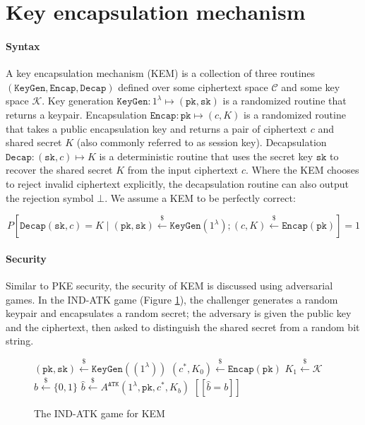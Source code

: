 \documentclass[letterpaper,12pt,titlepage,oneside,final]{book}
\newcommand{\keygen}{\texttt{KeyGen}}
\newcommand{\encap}{\texttt{Encap}}
\newcommand{\decap}{\texttt{Decap}}
\newcommand{\pk}{\texttt{pk}}
\newcommand{\sk}{\texttt{sk}}
\newcommand{\leftsample}{\stackrel{\$}{\leftarrow}}
\newcommand{\llbrack}{[\![}
\newcommand{\rrbrack}{]\!]}
\begin{document}
\section{Key encapsulation mechanism}\label{sec:key-encapsulation-mechanism}
\paragraph{Syntax} A key encapsulation mechanism (KEM) is a collection of three routines \\$(\keygen, \encap, \decap)$ defined over some ciphertext space $\mathcal{C}$ and some key space $\mathcal{K}$. Key generation $\keygen: 1^\lambda \mapsto (\pk, \sk)$ is a randomized routine that returns a keypair. Encapsulation $\encap: \pk \mapsto (c, K)$ is a randomized routine that takes a public encapsulation key and returns a pair of ciphertext $c$ and shared secret $K$ (also commonly referred to as session key). Decapsulation $\decap: (\sk, c) \mapsto K$ is a deterministic routine that uses the secret key $\sk$ to recover the shared secret $K$ from the input ciphertext $c$. Where the KEM chooses to reject invalid ciphertext explicitly, the decapsulation routine can also output the rejection symbol $\bot$. We assume a KEM to be perfectly correct:

$$
P\left[
    \decap(\sk, c) = K \mid (\pk, \sk) \leftsample \keygen(1^\lambda); (c, K) \leftsample \encap(\pk)
\right] = 1
$$

\paragraph{Security} Similar to PKE security, the security of KEM is discussed using adversarial games. In the IND-ATK game (Figure \ref{fig:kem-ind-atk-game}), the challenger generates a random keypair and encapsulates a random secret; the adversary is given the public key and the ciphertext, then asked to distinguish the shared secret from a random bit string.

\begin{figure}[htbp]
    \centering
    \begin{minipage}[t]{0.5\textwidth}
        \begin{algorithm}[H]
            \caption*{KEM IND-ATK Game}
            \begin{algorithmic}[1]
                \State $(\pk, \sk) \leftsample \keygen((1^\lambda))$
                \State $(c^\ast, K_0) \leftsample \encap(\pk)$
                \State $K_1 \leftsample \mathcal{K}$
                \State $b \leftsample \{0,1\}$
                \State $\hat{b} \leftsample A^\texttt{ATK}(1^\lambda, \pk, c^\ast, K_b)$
                \State \Return $\llbrack \hat{b} = b \rrbrack$
            \end{algorithmic}
        \end{algorithm}
    \end{minipage}
    \caption{The IND-ATK game for KEM}\label{fig:kem-ind-atk-game}
\end{figure}
\end{document}
